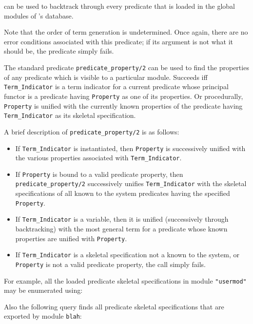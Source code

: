 \begin{description}
    can be used to backtrack through every predicate that is loaded in the
    global modules of \ourprolog's database.

    Note that the order of term generation is undetermined. Once again, 
    there are no error conditions associated with this predicate; if its
    argument is not what it should be, the predicate simply fails.

\label{PredProp}
    The standard predicate {\tt predicate\_property/2} can be used to find 
    the properties of any predicate which is visible to a particular module.
    Succeeds iff {\tt Term\_Indicator} is a term indicator for a current 
    predicate whose principal functor is a predicate having {\tt Property} 
    as one of its properties. Or procedurally, {\tt Property} is unified 
    with the currently known properties of the predicate having 
    {\tt Term\_Indicator} as its skeletal specification.
    
    A brief description of {\tt predicate\_property/2} is as follows:
    \begin{itemize}
    \item If {\tt Term\_Indicator} is instantiated, then {\tt Property}
          is successively unified with the various properties associated 
          with {\tt Term\_Indicator}.
    \item If {\tt Property} is bound to a valid predicate property, then
          {\tt predicate\_property/2} successively unifies 
          {\tt Term\_Indicator} with the skeletal specifications of all 
          known to the system predicates having the specified {\tt Property}.
    \item If {\tt Term\_Indicator} is a variable, then it is unified
          (successively through backtracking) with the most general term for a
          predicate whose known properties are unified with {\tt Property}.
    \item If {\tt Term\_Indicator} is a skeletal specification not a known to 
          the system, or {\tt Property} is not a valid predicate 
	  property, the call simply fails.
    \end{itemize} 
    For example, all the loaded predicate skeletal specifications in module 
    {\tt "usermod"} may be enumerated using:


    Also the following query finds all predicate skeletal specifications that 
    are exported by module {\tt blah}:


\end{description}
